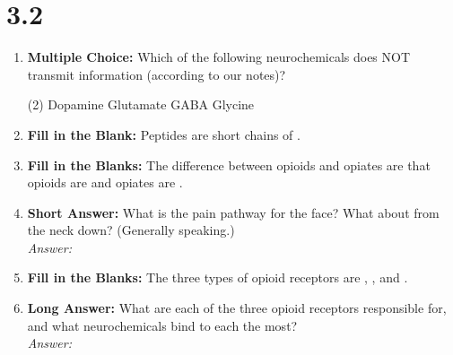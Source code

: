 \squigglyline
\section*{3.2}

\begin{enumerate}[label=\textbf{Q3.2.\arabic*}]
    \item \textbf{Multiple Choice:} Which of the following neurochemicals does NOT transmit information (according to our notes)?
        \begin{tasks}[label=\textcolor{\documentTheme}{(\Alph*)}, item-format=\color{\documentTheme}, label-width=1.5em, item-indent=1.7em](2)
            \task Dopamine
            \task Glutamate
            \task GABA
            \task Glycine
        \end{tasks}

    \item \textbf{Fill in the Blank:} Peptides are short chains of \underline{\hspace{3cm}}.

    \item \textbf{Fill in the Blanks:} The difference between opioids and opiates are that opioids are \underline{\hspace{3cm}} and opiates are \underline{\hspace{3cm}}.

    \item \textbf{Short Answer:} What is the pain pathway for the face? What about from the neck down? (Generally speaking.) \\
        \textit{Answer:} %

    \item \textbf{Fill in the Blanks:} The three types of opioid receptors are \underline{\hspace{3cm}}, \underline{\hspace{3cm}}, and \underline{\hspace{3cm}}.

    \item \textbf{Long Answer:} What are each of the three opioid receptors responsible for, and what neurochemicals bind to each the most? \\
        \textit{Answer:} \\[1cm] %


\end{enumerate}
